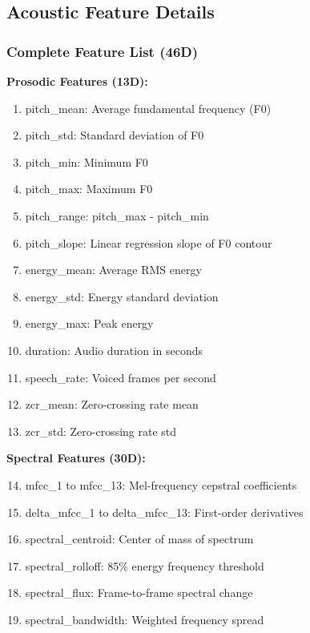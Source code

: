 
\subsection{Acoustic Feature Details}

\subsubsection{Complete Feature List (46D)}

\textbf{Prosodic Features (13D):}
\begin{enumerate}
    \item pitch\_mean: Average fundamental frequency (F0)
    \item pitch\_std: Standard deviation of F0
    \item pitch\_min: Minimum F0
    \item pitch\_max: Maximum F0
    \item pitch\_range: pitch\_max - pitch\_min
    \item pitch\_slope: Linear regression slope of F0 contour
    \item energy\_mean: Average RMS energy
    \item energy\_std: Energy standard deviation
    \item energy\_max: Peak energy
    \item duration: Audio duration in seconds
    \item speech\_rate: Voiced frames per second
    \item zcr\_mean: Zero-crossing rate mean
    \item zcr\_std: Zero-crossing rate std
\end{enumerate}

\textbf{Spectral Features (30D):}
\begin{enumerate}
    \setcounter{enumi}{13}
    \item mfcc\_1 to mfcc\_13: Mel-frequency cepstral coefficients
    \item delta\_mfcc\_1 to delta\_mfcc\_13: First-order derivatives
    \item spectral\_centroid: Center of mass of spectrum
    \item spectral\_rolloff: 85\% energy frequency threshold
    \item spectral\_flux: Frame-to-frame spectral change
    \item spectral\_bandwidth: Weighted frequency spread
\end{enumerate}

